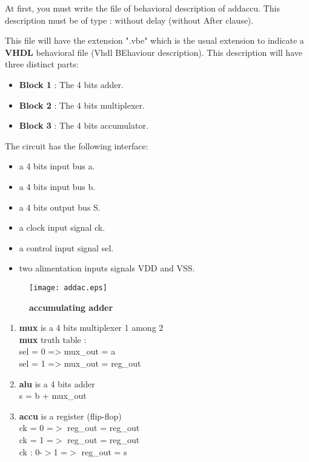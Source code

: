 \documentclass{article}
\begin{document}
{At first, you must write the file of behavioral description of addaccu.
This description must be of type : without delay (without After clause).

This file will have the extension ".vbe" which is the usual extension
to indicate a {\bf VHDL} behavioral file (Vhdl BEhaviour description).
This description will have three distinct parts:

\begin{itemize}\itemsep=-.8ex
\item {\bf Block 1} : The 4 bits adder.
\item {\bf Block 2} : The 4 bits multiplexer.
\item {\bf Block 3} : The 4 bits accumulator.
\end{itemize}

The circuit has the following interface:

\begin{itemize}\itemsep=-.8ex
\item  a 4 bits input bus a.
\item  a 4 bits input bus b.
\item  a 4 bits output bus S.
\item  a clock input signal ck.
\item  a control input signal sel.
\item  two alimentation inputs signals VDD and VSS.
\end{itemize}


\begin{figure}[H]
  \center
  \texttt{[image: addac.eps]}
  \caption{\bf accumulating adder }
\end{figure}

\begin{enumerate}
\item {\bf mux } is a 4 bits multiplexer 1 among 2\\
    {\bf mux} truth table : \\
    sel = 0 => mux\_out = a \\
    sel = 1 => mux\_out = reg\_out \\
\item {\bf alu} is a 4 bits adder \\
    s = b + mux\_out \\
\item {\bf accu} is a register (flip-flop) \\
    ck = 0 =$>$ reg\_out = reg\_out \\
    ck = 1 =$>$ reg\_out = reg\_out \\
    ck : 0-$>$1 =$>$ reg\_out = s \\
\end{enumerate}

}
\end{document}
